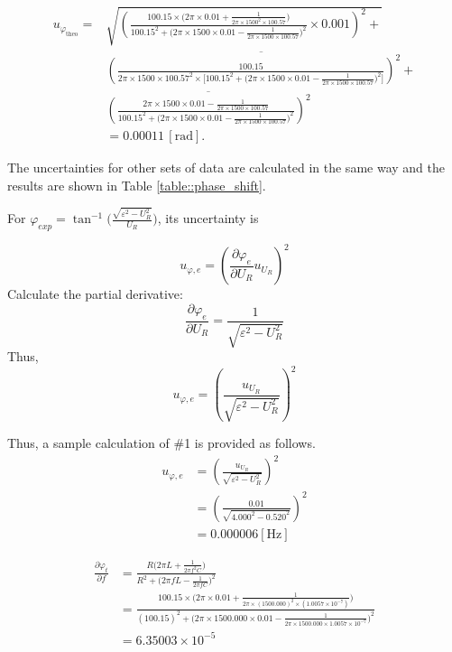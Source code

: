 \documentclass[a4paper]{article}
\begin{document}
\begin{align*}
	u_{\varphi_\text{theo}} = & \sqrt{\left( \frac{100.15\times\big(2\pi\times0.01 +\frac{1}{2\pi\times 1500^2\times 100.57}\big)}{100.15^2 + \big(2\pi\times 1500\times 0.01 - \frac{1}{2\pi\times 1500\times 100.57}\big)^2}\times 0.001 \right)^2 +} \\
	                          & \overline{\left( \frac{100.15}{2\pi\times 1500\times 100.57^2 \times \big[100.15^2+\big(2\pi\times1500\times 0.01 - \frac{1}{2\pi\times1500\times100.57}\big)^2\big]} \right)^2 +}                                      \\
	                          & \overline{\left( \frac{2\pi\times 1500\times0.01-\frac{1}{2\pi\times 1500\times 100.57}}{100.15^2+\big(2\pi\times 1500\times0.01-\frac{1}{2\pi\times 1500\times 100.57}\big)^2} \right)^2}                              \\
	                          & = 0.00011\,[\text{rad}].
\end{align*}

The uncertainties for other sets of data are calculated in the same way and the results are shown in Table \ref{table::phase_shift}.

For $\varphi_{exp} = \tan^{-1}\bigg(\frac{\sqrt{\varepsilon^2-U_R^2}}{U_R}\bigg)$, its uncertainty is

$$u_{\varphi,e} = (\frac{\partial \varphi_e}{\partial U_R}u_{U_R})^2 $$
Calculate the partial derivative:
$$\frac{\partial \varphi_e}{\partial U_R}=\frac{1}{\sqrt{\varepsilon^2-U_R^2}}$$
Thus,
$$u_{\varphi,e} = (\frac{u_{U_R}}{\sqrt{\varepsilon^2-U_R^2}})^2 $$

Thus, a sample calculation of $\#$1 is provided as follows.
\begin{align*}
	u_{\varphi,e}
	 & = (\frac{u_{U_R}}{\sqrt{\varepsilon^2-U_R^2}})^2 \\
	 & = (\frac{0.01}{\sqrt{4.000^2-0.520^2}})^2        \\
	 & = 0.000006 [\text{Hz}]
\end{align*}

\begin{align*}
	\frac{\partial \varphi_t}{\partial f}
	 & = \frac{R\big(2\pi L +\frac{1}{2\pi f^2 C}\big)}{R^2 + \big(2\pi fL - \frac{1}{2\pi fC}\big)^2}                                                                                                                                       \\
	 & = \frac{100.15\times \big(2\pi \times 0.01 +\frac{1}{2\pi\times (1500.000)^2\times (1.0057\times 10^{-7})}\big)}{(100.15)^2 + \big(2\pi \times 1500.000\times 0.01 - \frac{1}{2\pi\times 1500.000\times 1.0057\times 10^{-7}}\big)^2} \\
	 & = 6.35003\times 10^{-5}
\end{align*}
\end{document}
